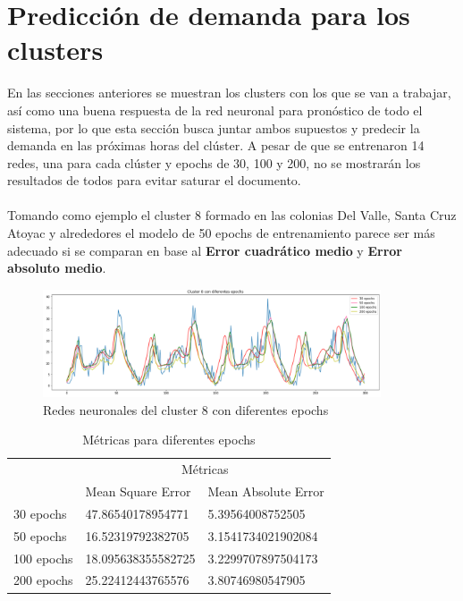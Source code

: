 \documentclass[12pt,spanish]{article}
\begin{document}
	\section{Predicción de demanda para los clusters}
	En las secciones anteriores se muestran los clusters con los que se van a trabajar, así como una buena respuesta de la red neuronal para pronóstico de todo el sistema, por lo que esta sección busca juntar ambos supuestos y predecir la demanda en las próximas horas del clúster. A pesar de que se entrenaron 14 redes, una para cada clúster y epochs de 30, 100 y 200, no se mostrarán los resultados de todos para evitar saturar el documento.\\\\
	Tomando como ejemplo el cluster 8 formado en las colonias Del Valle, Santa Cruz Atoyac y alrededores el modelo de 50 epochs de entrenamiento parece ser más adecuado si se comparan en base al \textbf{Error cuadrático medio} y \textbf{Error absoluto medio}.
	\begin{figure}[H]
		\centering
		\includegraphics[width=10cm]{Imagenes/m8_many.PNG}
		\begin{centering}
			\caption{Redes neuronales del cluster 8 con diferentes epochs}
		\end{centering}
	\end{figure}
	\begin{table}[H]
		\centering
		\caption{Métricas para diferentes epochs}
		\label{my-label}
		\begin{tabular}{ | l | l | l |}
			\hline
			& \multicolumn{2}{|c|}{Métricas}\\ \cline{2-3}
			& Mean Square Error & Mean Absolute Error \\ \hline
			30 epochs & 47.86540178954771 & 5.39564008752505\\ \hline
			50 epochs & 16.52319792382705 & 3.1541734021902084 \\ \hline
			100 epochs & 18.095638355582725 & 3.2299707897504173 \\ \hline
			200 epochs & 25.22412443765576 & 3.80746980547905 \\ \hline
		\end{tabular}
	\end{table}
\end{document}
